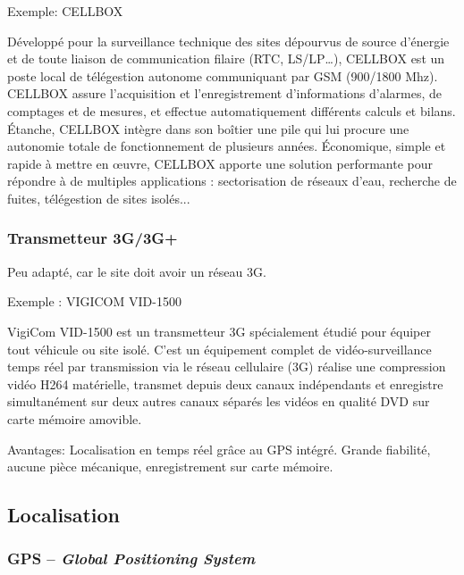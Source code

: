 Exemple: CELLBOX

Développé pour la surveillance technique des sites dépourvus de source d’énergie et de toute liaison de communication filaire (RTC, LS/LP…), CELLBOX est un poste local de télégestion autonome communiquant par GSM (900/1800 Mhz).
CELLBOX assure l’acquisition et l’enregistrement d’informations d’alarmes, de comptages et de mesures, et effectue automatiquement différents calculs et bilans.
Étanche, CELLBOX intègre dans son boîtier une pile qui lui procure une autonomie totale de fonctionnement de plusieurs années.
Économique, simple et rapide à mettre en œuvre, CELLBOX apporte une solution performante pour répondre à de multiples applications : sectorisation de réseaux d’eau, recherche de fuites, télégestion de sites isolés...


\subsubsection{Transmetteur 3G/3G+}

Peu adapté, car le site doit avoir un réseau 3G.

Exemple : VIGICOM VID-1500

\begin{figure}
\begin{center}


\end{center}
\end{figure}

VigiCom VID-1500 est un transmetteur  3G spécialement étudié pour équiper tout véhicule ou site isolé. C’est un équipement complet de vidéo-surveillance temps réel par transmission via le réseau cellulaire (3G) réalise une compression vidéo H264 matérielle, transmet depuis deux canaux indépendants et enregistre simultanément sur deux autres canaux séparés les vidéos en qualité DVD sur carte mémoire amovible.

Avantages:
Localisation en temps réel grâce au GPS intégré. 
Grande fiabilité, aucune pièce mécanique, enregistrement sur carte mémoire.
\subsection{Localisation}

\subsubsection{GPS – \textsl{Global Positioning System}}

